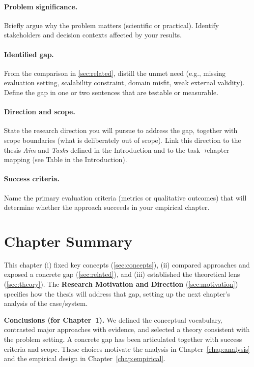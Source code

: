 \paragraph{Problem significance.}
Briefly argue why the problem matters (scientific or practical). Identify stakeholders and decision contexts affected by your results.

\paragraph{Identified gap.}
From the comparison in \cref{sec:related}, distill the unmet need (e.g., missing evaluation setting, scalability constraint, domain misfit, weak external validity). Define the gap in one or two sentences that are testable or measurable.

\paragraph{Direction and scope.}
State the research direction you will pursue to address the gap, together with scope boundaries (what is deliberately out of scope). Link this direction to the thesis \emph{Aim} and \emph{Tasks} defined in the Introduction and to the task→chapter mapping (see Table in the Introduction).

\paragraph{Success criteria.}
Name the primary evaluation criteria (metrics or qualitative outcomes) that will determine whether the approach succeeds in your empirical chapter.

\section{Chapter Summary}
\label{sec:summary}
This chapter (i) fixed key concepts (\cref{sec:concepts}), (ii) compared approaches and exposed a concrete gap (\cref{sec:related}), and (iii) established the theoretical lens (\cref{sec:theory}). The \textbf{Research Motivation and Direction} (\cref{sec:motivation}) specifies how the thesis will address that gap, setting up the next chapter’s analysis of the case/system.

\noindent\textbf{Conclusions (for Chapter~1).}
We defined the conceptual vocabulary, contrasted major approaches with evidence, and selected a theory consistent with the problem setting. A concrete gap has been articulated together with success criteria and scope. These choices motivate the analysis in Chapter~\ref{chap:analysis} and the empirical design in Chapter~\ref{chap:empirical}.
